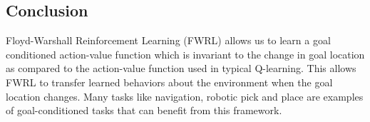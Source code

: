 \subsection{Conclusion}
Floyd-Warshall Reinforcement Learning (FWRL) allows us to learn a goal
conditioned action-value function which is invariant to the change in goal
location as compared to the action-value function used in typical Q-learning.
This allows FWRL to transfer learned behaviors about the environment when the
goal location changes. Many tasks like navigation, robotic pick and place are
examples of goal-conditioned tasks that can benefit from this framework.
